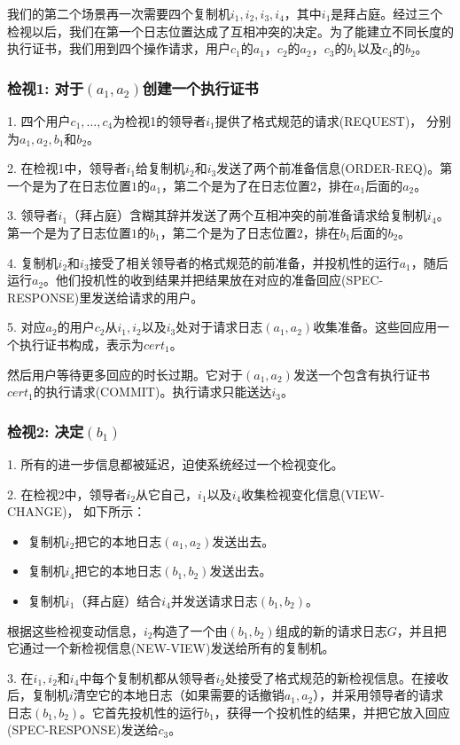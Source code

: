 \documentclass[UTF8]{ctexart}
\begin{document}
我们的第二个场景再一次需要四个复制机$i_1, i_2, i_3, i_4$，其中$i_1$是拜占庭。经过三个检视以后，我们在第一个日志位置达成了互相冲突的决定。为了能建立不同长度的执行证书，我们用到四个操作请求，用户$c_1$的$a_1$，$c_2$的$a_2$，$c_3$的$b_1$以及$c_4$的$b_2$。

\subsubsection*{检视1: 对于$(a_1, a_2)$创建一个执行证书}
1. 四个用户$c_1, \ldots, c_4$为检视1的领导者$i_1$提供了格式规范的请求(REQUEST)， 分别为$a_1, a_2, b_1$和$b_2$。

2. 在检视1中，领导者$i_1$给复制机$i_2$和$i_3$发送了两个前准备信息(ORDER-REQ)。第一个是为了在日志位置$1$的$a_1$，第二个是为了在日志位置$2$，排在$a_1$后面的$a_2$。

3. 领导者$i_1$（拜占庭）含糊其辞并发送了两个互相冲突的前准备请求给复制机$i_4$。第一个是为了日志位置$1$的$b_1$，第二个是为了日志位置$2$，排在$b_1$后面的$b_2$。

4. 复制机$i_2$和$i_3$接受了相关领导者的格式规范的前准备，并投机性的运行$a_1$，随后运行$a_2$。他们投机性的收到结果并把结果放在对应的准备回应(SPEC-RESPONSE)里发送给请求的用户。

5. 对应$a_2$的用户$c_2$从$i_1, i_2$以及$i_3$处对于请求日志$(a_1, a_2)$收集准备。这些回应用一个执行证书构成，表示为$cert_1$。

然后用户等待更多回应的时长过期。它对于$(a_1, a_2)$发送一个包含有执行证书$cert_1$的执行请求(COMMIT)。执行请求只能送达$i_3$。

\subsubsection*{检视2: 决定$(b_1)$}
1. 所有的进一步信息都被延迟，迫使系统经过一个检视变化。

2. 在检视2中，领导者$i_2$从它自己，$i_1$以及$i_4$收集检视变化信息(VIEW-CHANGE)， 如下所示：
\begin{itemize}
	\item 复制机$i_2$把它的本地日志$(a_1, a_2)$发送出去。 
	\item 复制机$i_4$把它的本地日志$(b_1, b_2)$发送出去。
	\item 复制机$i_1$（拜占庭）结合$i_4$并发送请求日志$(b_1, b_2)$。
\end{itemize}
根据这些检视变动信息，$i_2$构造了一个由$(b_1, b_2)$组成的新的请求日志$G$，并且把它通过一个新检视信息(NEW-VIEW)发送给所有的复制机。

3. 在$i_1, i_2$和$i_4$中每个复制机都从领导者$i_2$处接受了格式规范的新检视信息。在接收后，复制机$i$清空它的本地日志（如果需要的话撤销$a_1, a_2$），并采用领导者的请求日志$(b_1, b_2)$。它首先投机性的运行$b_1$，获得一个投机性的结果，并把它放入回应(SPEC-RESPONSE)发送给$c_3$。
\end{document}

